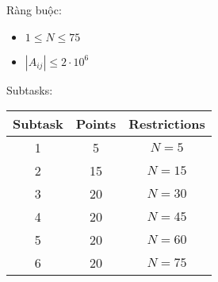 Ràng buộc:
\begin{itemize}
    \item $1 \le N \le 75$
    \item $|A_{ij}| \le 2 \cdot 10^6$
\end{itemize}
Subtasks:
\begin{table}
\centering
\begin{tabular}{|c|c|c|}
\hline
Subtask & Points & Restrictions \\
\hline
1 & 5  & $N = 5$ \\ \hline
2 & 15 & $N = 15$ \\ \hline
3 & 20 & $N = 30$ \\ \hline
4 & 20 & $N = 45$ \\ \hline
5 & 20 & $N = 60$ \\ \hline
6 & 20 & $N = 75$ \\ 
\hline
\end{tabular}
\end{table}